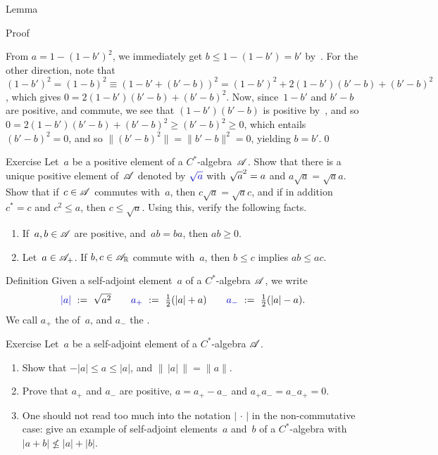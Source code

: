 \documentclass[main]{subfiles}
\begin{document}
\begin{parsec}
\begin{point}{Lemma}
\begin{point}{Proof}
\begin{point}
\begin{point}
From $a=1-(1-b')^2$,
we immediately get $b \leq 1-(1-b')=b'$ by~.
For the other direction,
note that
$(1-b')^2= (1-b)^2 \equiv (1-b'+(b'-b))^2 = (1-b')^2+2(1-b')(b'-b)+(b'-b)^2$,
which gives $0=2(1-b')(b'-b)+(b'-b)^2$.
Now, since~$1-b'$ and $b'-b$ are positive,
and commute, we see that $(1-b')(b'-b)$ is positive 
by~, and so 
 $0=2(1-b')(b'-b)+(b'-b)^2\geq (b'-b)^2 \geq 0$,
which entails $(b'-b)^2=0$, and so $\|(b'-b)^2\|=\|b'-b\|^2=0$,
yielding $b=b'$.\qed
\end{point}
\end{point}
\end{point}
\end{point}
\begin{point}[sqrt]{Exercise}%
Let~$a$ be a positive element of a $C^*$-algebra~$\mathscr{A}$.
Show that there is a unique 
positive element of~$\mathscr{A}$
denoted by $\Define{\sqrt{a}}$ with $\smash{\sqrt{a}^2}=a$
and $a\sqrt{a}=\sqrt{a}a$.
Show that if~$c\in\mathscr{A}$ commutes with~$a$,
then $c\sqrt{a}=\sqrt{a}c$,
and if in addition $c^*=c$ and $c^2\leq a$,
then $c\leq \sqrt{a}$.
Using this, verify the following facts.
\begin{enumerate}
\item
If~$a,b\in \mathscr{A}$ are positive,
and~$ab=ba$,
then $ab\geq 0$.

\item
Let~$a\in\mathscr{A}_{+}$.
If $b,c\in \mathscr{A}_{\mathbb{R}}$ commute with~$a$,
then $b\leq c$ implies $ab\leq ac$.
\end{enumerate}
\end{point}
\begin{point}{Definition}
Given a self-adjoint element~$a$ of a $C^*$-algebra $\mathscr{A}$,
we write
\begin{equation*}
\textstyle
\Define{\left|a\right|}\ :=\ \sqrt{a^2}
\qquad
\Define{\pos{a}}\ :=\ \frac{1}{2}(\left|a\right| + a)
\qquad
\Define{a_{-}}\ :=\ \frac{1}{2}(\left|a\right| - a).
\end{equation*}
We call $a_+$ the  of~$a$,
and $a_-$ the .
\end{point}
\begin{point}{Exercise}%
Let~$a$ be a self-adjoint element of a
 $C^*$-algebra $\mathscr{A}$.
\begin{enumerate}
\item
Show that $-\left|a\right| \leq a \leq \left| a \right|$,
and $\|\,\left|a\right|\,\|= \|a\|$.
\item
Prove that $a_+$ and $a_-$ are positive,  $a=a_+-a_-$
and $a_+a_-=a_-a_+=0$.
\item
One should not read too much into the notation
$\left|\,\cdot\,\right|$
in the non-commutative case:
give an example of
self-adjoint elements~$a$ and~$b$ of a $C^*$-algebra with
 $\left|a+b\right|\nleq \left|a\right|+ \left|b\right|$.


\end{enumerate}
\end{point}
\end{parsec}
\end{document}
